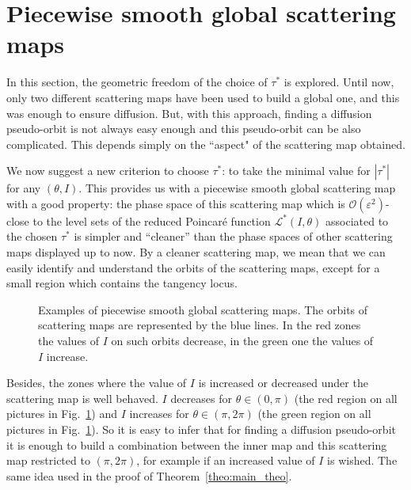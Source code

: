 \documentclass[a4paper,10pt]{article}
\theoremstyle{definition}
\begin{document}
\section{Piecewise smooth global scattering maps}
\label{sec:piecewise}

In this section, the geometric freedom of the choice of $\tau^*$ is explored.
Until now, only two different scattering maps have been used to build a global one, and this was enough to ensure diffusion.
But, with this approach, finding a diffusion pseudo-orbit is not always easy enough and this pseudo-orbit can be also complicated.
This depends simply on the ``aspect" of the scattering map obtained.

We now suggest a new criterion to choose $\tau^*$: to take the minimal value for $\left|\tau^*\right|$ for any $(\theta , I)$.
This provides us with a piecewise smooth global scattering map with a good property: the phase space of this scattering map which is $\mathcal{O}(\varepsilon^2)$-close to the level sets of the reduced Poincar\'{e} function $\mathcal{L}^*(I,\theta)$ associated to the chosen $\tau^*$ is simpler and ``cleaner'' than the phase spaces of other scattering maps displayed up to now.
By a cleaner scattering map, we mean that we can easily identify and understand the orbits of the scattering maps, except for a small region which contains the tangency locus.

\begin{figure}[h]
\centering
\subfigure[Piecewise scattering map for $\mu = 0.3$.]{\texttt{[image: 03\_pw\_sm]}\label{fig:pw_03}}
\subfigure[Piecewise scattering map for $\mu = 0.5$.]{\texttt{[image: 05\_pw\_sm]}\label{fig:pw_05}}
\subfigure[Piecewise scattering map for $\mu = 0.9$.]{\texttt{[image: 09\_pw\_sm]}\label{fig:pw_09}}
\subfigure[Piecewise scattering map for $\mu = 1.5$.]{\texttt{[image: 15\_pw\_sm]}\label{fig:pw_15}}
\caption{Examples of piecewise smooth global scattering maps. The orbits of scattering maps are represented by the blue lines.
In the red zones the values of $I$ on such orbits decrease, in the green one the values of $I$ increase. \label{fig:global_sm_piece}}
\end{figure}

Besides, the zones where the value of $I$ is increased or decreased under the scattering map is well behaved.
$I$ decreases for $\theta \in (0,\pi)$ (the red region on all pictures in Fig.~\ref{fig:global_sm_piece}) and $I$ increases for $\theta  \in (\pi , 2\pi)$ (the green region on all pictures in Fig.~\ref{fig:global_sm_piece}).
So it is easy to infer that for finding a diffusion pseudo-orbit it is enough to build a combination between the inner map and this scattering map restricted to $(\pi , 2\pi)$, for example if an increased value of $I$ is wished.
The same idea used in the proof of Theorem~\ref{theo:main_theo}.
\end{document}
